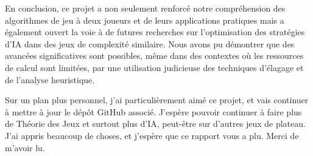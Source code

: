 En conclusion, ce projet a non seulement renforcé notre compréhension des algorithmes de jeu à deux joueurs et de leurs applications pratiques mais a également ouvert la voie à de futures recherches sur l'optimisation des stratégies d'IA dans des jeux de complexité similaire. Nous avons pu démontrer que des avancées significatives sont possibles, même dans des contextes où les ressources de calcul sont limitées, par une utilisation judicieuse des techniques d'élagage et de l'analyse heuristique.

Sur un plan plus personnel, j'ai particulièrement aimé ce projet, et vais continuer à mettre à jour le dépôt GitHub associé. J'espère pouvoir continuer à faire plus de Théorie des Jeux et surtout plus d'\ac{IA}, peut-être sur d'autres jeux de plateau. J'ai appris beaucoup de choses, et j'espère que ce rapport vous a plu. Merci de m'avoir lu.